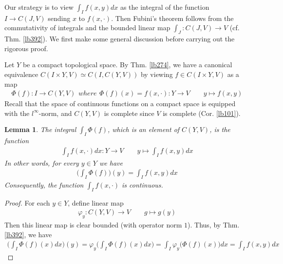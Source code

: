 \documentclass[12pt,b5paper,notitlepage]{article}
\theoremstyle{definition}
\theoremstyle{plain}
\newtheorem{lm}[df]{Lemma}
\numberwithin{equation}{section}
\begin{document}
Our strategy is to view $\int_I f(x,y)dx$ as the integral of the function $I\rightarrow C(J,V)$ sending $x$ to $f(x,\cdot)$. Then Fubini's theorem follows from the commutativity of integrals and the bounded linear map $\int_J:C(J,V)\rightarrow V$ (cf. Thm. \ref{lb392}). We first make some general discussion before carrying out the rigorous proof.


Let $Y$ be a compact topological space. By Thm. \ref{lb274}, we have a canonical equivalence $C(I\times Y,V)\simeq C(I,C(Y,V))$ by viewing $f\in C(I\times Y,V)$ as a map
\begin{subequations}\label{eq167}
\begin{align}
\Phi(f):I\rightarrow C(Y,V)
\end{align}
where
\begin{align}
\Phi(f)(x)=f(x,\cdot):Y\rightarrow V\qquad y\mapsto f(x,y)
\end{align}
\end{subequations}
Recall that the space of continuous functions on a compact space is equipped with the $l^\infty$-norm, and $C(Y,V)$ is complete since $V$ is complete (Cor. \ref{lb101}).

\begin{lm}\label{lb400}
The integral  $\int_I\Phi(f)$, which is an element of $C(Y,V)$, is the function
\begin{align}
\int_If(x,\cdot)dx:Y\rightarrow V\qquad y\mapsto \int_I f(x,y)dx
\end{align}
In other words, for every $y\in Y$ we have
\begin{align}
\Big(\int_I\Phi(f)\Big)(y)=\int_I f(x,y)dx
\end{align}
Consequently, the function $\int_If(x,\cdot)$ is continuous.
\end{lm}


\begin{proof}
For each $y\in Y$, define linear map
\begin{align*}
\varphi_y:C(Y,V)\rightarrow V\qquad g\mapsto g(y)
\end{align*}
Then this linear map is clear bounded (with operator norm $1$). Thus, by Thm. \ref{lb392}, we have
\begin{align*}
\Big(\int_I\Phi(f)(x)dx\Big)(y)=\varphi_y\Big(\int_I\Phi(f)(x)dx\Big)=\int_I\varphi_y\big(\Phi(f)(x)\big)dx=\int_I f(x,y)dx
\end{align*}
\end{proof}
\end{document}
